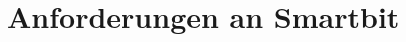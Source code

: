 \documentclass[11pt,a4paper]{report}
\begin{document}
\section{Anforderungen an Smartbit}\label{sec:anforderungen}


\end{document}
